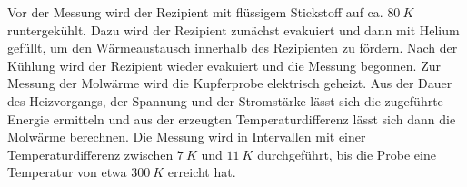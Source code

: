 Vor der Messung wird der Rezipient mit flüssigem Stickstoff auf ca. $\SI{80}{K}$ runtergekühlt. Dazu wird der Rezipient zunächst evakuiert und dann mit Helium gefüllt,
um den Wärmeaustausch innerhalb des Rezipienten zu fördern. Nach der Kühlung wird der Rezipient wieder evakuiert und die Messung begonnen. Zur Messung der Molwärme wird
die Kupferprobe elektrisch geheizt. Aus der Dauer des Heizvorgangs, der Spannung und der Stromstärke lässt sich die zugeführte Energie ermitteln und aus der erzeugten
Temperaturdifferenz lässt sich dann die Molwärme berechnen. Die Messung wird in Intervallen mit einer Temperaturdifferenz zwischen $\SI{7}{K}$ und $\SI{11}{K}$ durchgeführt,
bis die Probe eine Temperatur von etwa $\SI{300}{K}$ erreicht hat.
